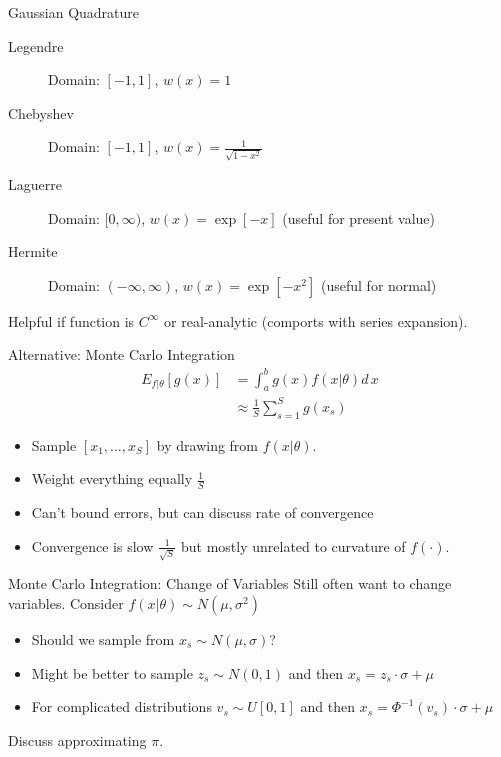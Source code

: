 \documentclass[xcolor=pdftex,dvipsnames,table,mathserif,aspectratio=169]{beamer}
\begin{document}
\begin{frame}{Gaussian Quadrature}
\begin{description}
\item[Legendre] Domain: $[-1,1]$, $w(x) = 1$
\item[Chebyshev] Domain: $[-1,1]$, $w(x) = \frac{1}{\sqrt{1-x^2}}$
\item[Laguerre] Domain: $[0,\infty)$, $w(x) = \exp[-x]$ (useful for present value)
\item[Hermite] Domain: $(-\infty,\infty)$, $w(x) = \exp[-x^2]$ (useful for normal)
\end{description}
Helpful if function is $C^{\infty}$ or real-analytic (comports with series expansion).
\end{frame}



\begin{frame}{Alternative: Monte Carlo Integration}
\begin{align*}
E_{f| \theta}[g(x)] &= \int_{a}^b g(x) f(x | \theta) d\,x\\
&\approx \frac{1}{S} \sum_{s=1}^S g(x_s)
\end{align*}
\begin{itemize}
\item Sample $[x_1,\ldots,x_S]$ by drawing from $f(x | \theta)$.
\item Weight everything equally $\frac{1}{S}$
\item Can't bound errors, but can discuss rate of convergence
\item Convergence is slow $\frac{1}{\sqrt{S}}$ but mostly unrelated to curvature of $f(\cdot)$.
\end{itemize}
\end{frame}


\begin{frame}{Monte Carlo Integration: Change of Variables}
Still often want to change variables. Consider $f(x | \theta) \sim N(\mu,\sigma^2)$
\begin{itemize}
\item Should we sample from $x_s \sim N(\mu,\sigma)$?
\item Might be better to sample $z_s \sim N(0,1)$ and then $x_s = z_s\cdot \sigma + \mu$
\item For complicated distributions $v_s \sim U[0,1]$ and then $x_s = \Phi^{-1}(v_s) \cdot \sigma + \mu$
\end{itemize}
Discuss approximating $\pi$.
\end{frame}
\end{document}
